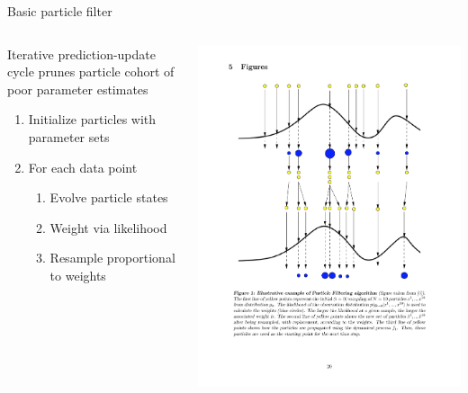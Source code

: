 \documentclass[12pt]{beamer}
\begin{document}
\begin{frame}

	\null
	\hspace{-0.475cm}
	\large
	Basic particle filter
	\vspace{\baselineskip}

	\begin{columns}
		\begin{column}{0.45\textwidth}

			\footnotesize
			Iterative prediction-update cycle prunes particle cohort of poor parameter estimates

			\begin{enumerate}
				\item Initialize particles with parameter sets
				\item For each data point
				\begin{enumerate}
					\footnotesize
					\item Evolve particle states
					\item Weight via likelihood
					\item Resample proportional to weights
				\end{enumerate}
			\end{enumerate}
			
			
		\end{column}
		\begin{column}{0.55\textwidth}

			\includegraphics[width=\textwidth,height=0.9\textheight,keepaspectratio=true]{images/PF-diagram}


\end{column}
\end{columns}
\end{frame}
\end{document}
